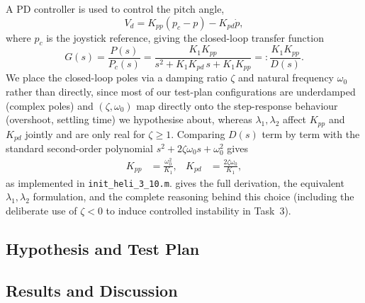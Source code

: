 A PD controller is used to control the pitch angle,
\begin{equation}\label{eq:pd}
	V_d = K_{pp}(p_c-p) - K_{pd}\dot{p},
\end{equation}
where $p_c$ is the joystick reference, giving the closed-loop transfer function
\begin{equation}\label{eq:tf}
	G(s) = \frac{P(s)}{P_c(s)} = \frac{K_1K_{pp}}{s^2 + K_1K_{pd}\,s + K_1K_{pp}} =: \frac{K_1K_{pp}}{D(s)}.
\end{equation}
We place the closed-loop poles via a damping ratio $\zeta$ and natural frequency $\omega_0$ rather than directly, since most of our test-plan configurations are underdamped (complex poles) and $(\zeta,\omega_0)$ map directly onto the step-response behaviour (overshoot, settling time) we hypothesise about, whereas $\lambda_1,\lambda_2$ affect $K_{pp}$ and $K_{pd}$ jointly and are only real for $\zeta\geq1$. Comparing $D(s)$ term by term with the standard second-order polynomial $s^2+2\zeta\omega_0s+\omega_0^2$ gives
\begin{subequations}\label{eq:kpp_kpd_zeta}
	\begin{align}
		K_{pp} &= \frac{\omega_0^2}{K_1}, & K_{pd} &= \frac{2\zeta\omega_0}{K_1},
	\end{align}
\end{subequations}
as implemented in \texttt{init\_heli\_3\_10.m}.  gives the full derivation, the equivalent $\lambda_1,\lambda_2$ formulation, and the complete reasoning behind this choice (including the deliberate use of $\zeta<0$ to induce controlled instability in Task~3).

\subsection{Hypothesis and Test Plan}\label{sec:part1_testplan}

\subsection{Results and Discussion}\label{sec:part1_results}
